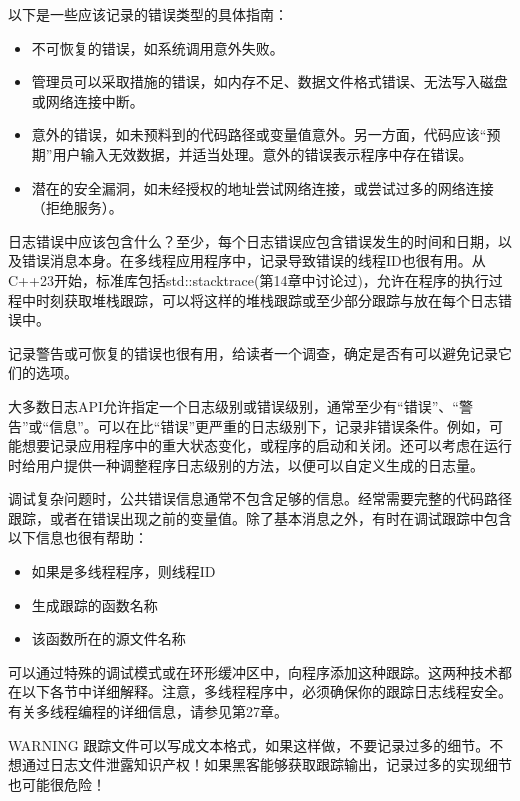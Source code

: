 以下是一些应该记录的错误类型的具体指南：

\begin{itemize}
\item
不可恢复的错误，如系统调用意外失败。

\item
管理员可以采取措施的错误，如内存不足、数据文件格式错误、无法写入磁盘或网络连接中断。

\item
意外的错误，如未预料到的代码路径或变量值意外。另一方面，代码应该“预期”用户输入无效数据，并适当处理。意外的错误表示程序中存在错误。

\item
潜在的安全漏洞，如未经授权的地址尝试网络连接，或尝试过多的网络连接（拒绝服务）。
\end{itemize}

日志错误中应该包含什么？至少，每个日志错误应包含错误发生的时间和日期，以及错误消息本身。在多线程应用程序中，记录导致错误的线程ID也很有用。从C++23开始，标准库包括std::stacktrace(第14章中讨论过)，允许在程序的执行过程中时刻获取堆栈跟踪，可以将这样的堆栈跟踪或至少部分跟踪与放在每个日志错误中。

记录警告或可恢复的错误也很有用，给读者一个调查，确定是否有可以避免记录它们的选项。

大多数日志API允许指定一个日志级别或错误级别，通常至少有“错误”、“警告”或“信息”。可以在比“错误”更严重的日志级别下，记录非错误条件。例如，可能想要记录应用程序中的重大状态变化，或程序的启动和关闭。还可以考虑在运行时给用户提供一种调整程序日志级别的方法，以便可以自定义生成的日志量。


调试复杂问题时，公共错误信息通常不包含足够的信息。经常需要完整的代码路径跟踪，或者在错误出现之前的变量值。除了基本消息之外，有时在调试跟踪中包含以下信息也很有帮助：

\begin{itemize}
\item
如果是多线程程序，则线程ID

\item
生成跟踪的函数名称

\item
该函数所在的源文件名称
\end{itemize}

可以通过特殊的调试模式或在环形缓冲区中，向程序添加这种跟踪。这两种技术都在以下各节中详细解释。注意，多线程程序中，必须确保你的跟踪日志线程安全。有关多线程编程的详细信息，请参见第27章。

\begin{myWarning}{WARNING}
跟踪文件可以写成文本格式，如果这样做，不要记录过多的细节。不想通过日志文件泄露知识产权！如果黑客能够获取跟踪输出，记录过多的实现细节也可能很危险！
\end{myWarning}

